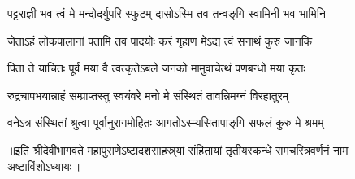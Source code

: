 \twolineshloka
{पट्टराज्ञी भव त्वं मे मन्दोदर्युपरि स्फुटम्}
{दासोऽस्मि तव तन्वङ्‌गि स्वामिनी भव भामिनि}%

\twolineshloka
{जेताऽहं लोकपालानां पतामि तव पादयोः}
{करं गृहाण मेऽद्य त्वं सनाथं कुरु जानकि}%

\twolineshloka
{पिता ते याचितः पूर्वं मया वै त्वत्कृतेऽबले}
{जनको मामुवाचेत्थं पणबन्धो मया कृतः}%

\twolineshloka
{रुद्रचापभयान्नाहं सम्प्राप्तस्तु स्वयंवरे}
{मनो मे संस्थितं तावन्निमग्नं विरहातुरम्}%

\twolineshloka
{वनेऽत्र संस्थितां श्रुत्वा पूर्वानुरागमोहितः}
{आगतोऽस्म्यसितापाङ्‌गि सफलं कुरु मे श्रमम्}%


॥इति श्रीदेवीभागवते महापुराणेऽष्टादशसाहस्र्यां संहितायां तृतीयस्कन्धे रामचरित्रवर्णनं नाम अष्टाविंशोऽध्यायः॥
